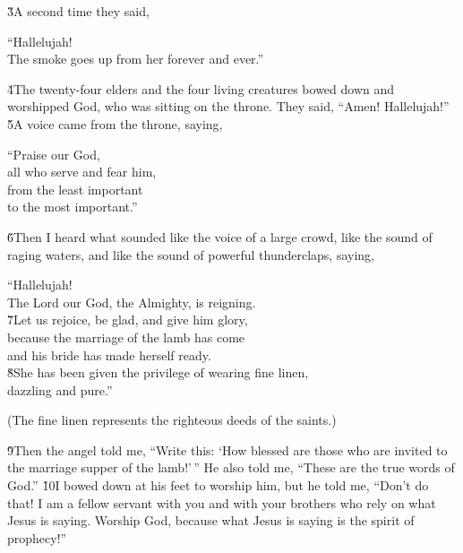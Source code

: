 \v{3}A second time they said,

\begin{poetry}
\poeml ``Hallelujah! \\
\poemll    The smoke goes up from her forever and ever.''
\end{poetry}

\v{4}The twenty-four elders and the four living creatures bowed down and worshipped God, who was sitting on the throne. They said, ``Amen! Hallelujah!'' \v{5}A voice came from the throne, saying,

\begin{poetry}
\poeml ``Praise our God, \\
\poemll    all who serve and fear him, \\
\poeml from the least important \\
\poemll    to the most important.''
\end{poetry}

\v{6}Then I heard what sounded like the voice of a large crowd, like the sound of raging waters, and like the sound of powerful thunderclaps, saying,

\begin{poetry}
\poeml ``Hallelujah! \\
\poemll    The Lord our God, the Almighty, is reigning. \\
\poeml \v{7}Let us rejoice, be glad, and give him glory, \\
\poemll    because the marriage of the lamb has come \\
\poemlll       and his bride has made herself ready. \\
\poeml \v{8}She has been given the privilege of wearing fine linen, \\
\poemll    dazzling and pure.''
\end{poetry}

(The fine linen represents the righteous deeds of the saints.)

\v{9}Then the angel told me, ``Write this: `How blessed are those who are invited to the marriage supper of the lamb!'\,'' He also told me, ``These are the true words of God.'' \v{10}I bowed down at his feet to worship him, but he told me, ``Don't do that! I am a fellow servant with you and with your brothers who rely on what Jesus is saying. Worship God, because what Jesus is saying is the spirit of prophecy!''

